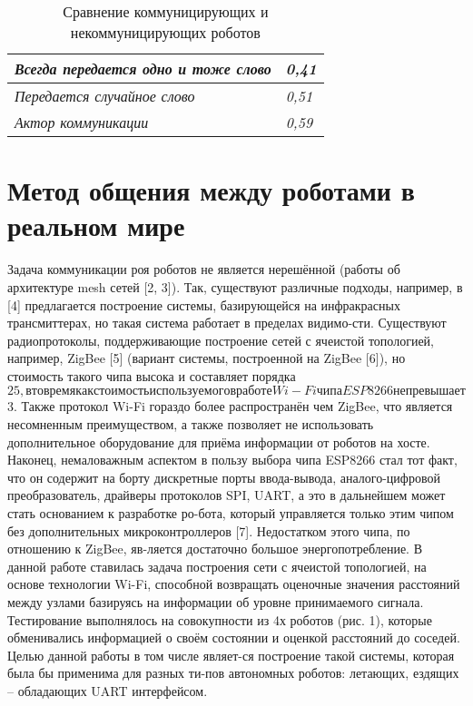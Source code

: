 \begin{table} [htbp]
	\centering
	\caption{ Сравнение коммуницирующих и некоммуницирующих роботов }
	\label{Ts0Sib6}%

	\begin{tabular}{|p{4.0in}|p{0.8in}|} \hline 
		\textit{Всегда передается одно и тоже слово} & \textit{0,41} \\ \hline 
		\textit{Передается случайное слово} & \textit{0,51} \\ \hline 
		\textit{Актор коммуникации} & \textit{0,59} \\ \hline 
	\end{tabular}
\end{table}

\section{Метод общения между роботами в реальном мире} \label{sect3_5}

Задача коммуникации роя роботов не является нерешённой (работы об архитектуре mesh сетей [2, 3]). Так, существуют различные подходы, например, в [4] предлагается построение системы, базирующейся на инфракрасных трансмиттерах, но такая система работает в пределах видимо-сти. Существуют радиопротоколы, поддерживающие построение сетей с ячеистой топологией, например, ZigBee [5] (вариант системы, построенной на ZigBee [6]), но стоимость такого чипа высока и составляет порядка $25, в то время как стоимость используемого в работе Wi-Fi чипа ESP8266 не превышает $3. Также протокол Wi-Fi гораздо более распространён чем ZigBee, что является несомненным преимуществом, а также позволяет не использовать дополнительное оборудование для приёма информации от роботов на хосте. Наконец, немаловажным аспектом в пользу выбора чипа ESP8266 стал тот факт, что он содержит на борту дискретные порты ввода-вывода, аналого-цифровой преобразователь, драйверы протоколов SPI, UART, а это в дальнейшем может стать основанием к разработке ро-бота, который управляется только этим чипом без дополнительных микроконтроллеров [7]. Недостатком этого чипа, по отношению к ZigBee, яв-ляется достаточно большое энергопотребление. 
В данной работе ставилась задача построения сети с ячеистой топологией, на основе технологии Wi-Fi, способной возвращать оценочные значения расстояний между узлами базируясь на информации об уровне принимаемого сигнала. Тестирование выполнялось на совокупности из 4х роботов (рис. 1), которые обменивались информацией о своём состоянии и оценкой расстояний до соседей. Целью данной работы в том числе являет-ся построение такой системы, которая была бы применима для разных ти-пов автономных роботов: летающих, ездящих – обладающих UART интерфейсом.

